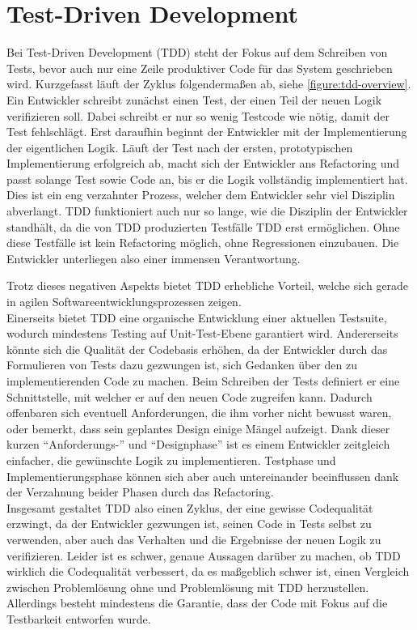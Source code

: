 \documentclass[12pt,DIV14,BCOR10mm,a4paper,twoside,parskip=half-,headsepline,headinclude,english,ngerman,bibliography=totocnumbered]{scrreprt}
\begin{document}
\chapter{Test-Driven Development}
\label{chapter:tdd}

Bei Test-Driven Development (TDD) steht der Fokus auf dem Schreiben von Tests, bevor auch nur eine Zeile produktiver Code für das System geschrieben wird.
Kurzgefasst läuft der Zyklus folgendermaßen ab, siehe \ref{figure:tdd-overview}.
Ein Entwickler schreibt zunächst einen Test, der einen Teil der neuen Logik verifizieren soll.
Dabei schreibt er nur so wenig Testcode wie nötig, damit der Test fehlschlägt.
Erst daraufhin beginnt der Entwickler mit der Implementierung der eigentlichen Logik.
Läuft der Test nach der ersten, prototypischen Implementierung erfolgreich ab, macht sich der Entwickler ans Refactoring und passt solange Test sowie Code an, bis er die Logik vollständig implementiert hat. \autocite{beck_2014}
Dies ist ein eng verzahnter Prozess, welcher dem Entwickler sehr viel Disziplin abverlangt.
TDD funktioniert auch nur so lange, wie die Disziplin der Entwickler standhält, da die von TDD produzierten Testfälle TDD erst ermöglichen.
Ohne diese Testfälle ist kein Refactoring möglich, ohne Regressionen einzubauen. \autocite{martin_2014}
Die Entwickler unterliegen also einer immensen Verantwortung.

Trotz dieses negativen Aspekts bietet TDD erhebliche Vorteil, welche sich gerade in agilen Softwareentwicklungsprozessen zeigen. \\
Einerseits bietet TDD eine organische Entwicklung einer aktuellen Testsuite, wodurch mindestens Testing auf Unit-Test-Ebene garantiert wird.
Andererseits könnte sich die Qualität der Codebasis erhöhen, da der Entwickler durch das Formulieren von Tests dazu gezwungen ist, sich Gedanken über den zu implementierenden Code zu machen.
Beim Schreiben der Tests definiert er eine Schnittstelle, mit welcher er auf den neuen Code zugreifen kann.
Dadurch offenbaren sich eventuell Anforderungen, die ihm vorher nicht bewusst waren, oder bemerkt, dass sein geplantes Design einige Mängel aufzeigt.
Dank dieser kurzen \enquote{Anforderungs-} und \enquote{Designphase} ist es einem Entwickler zeitgleich einfacher, die gewünschte Logik zu implementieren.
Testphase und Implementierungsphase können sich aber auch untereinander beeinflussen dank der Verzahnung beider Phasen durch das Refactoring. \\
Insgesamt gestaltet TDD also einen Zyklus, der eine gewisse Codequalität erzwingt, da der Entwickler gezwungen ist, seinen Code in Tests selbst zu verwenden, aber auch das Verhalten und die Ergebnisse der neuen Logik zu verifizieren.
Leider ist es schwer, genaue Aussagen darüber zu machen, ob TDD wirklich die Codequalität verbessert, da es maßgeblich schwer ist, einen Vergleich zwischen Problemlösung ohne und Problemlösung mit TDD herzustellen. \autocite{astels_2003} \\
Allerdings besteht mindestens die Garantie, dass der Code mit Fokus auf die Testbarkeit entworfen wurde.
\end{document}
